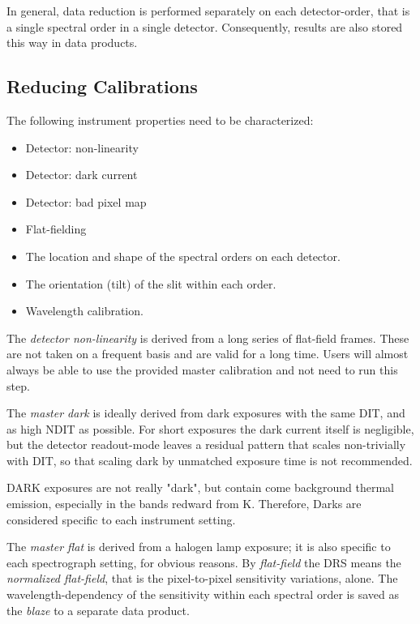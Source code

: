 In general, data reduction is performed separately on each detector-order,
that is a single spectral order in a single detector.
Consequently, results are also stored this way in data products.


\subsection{Reducing Calibrations}
\label{sec:calib:reduc}

The following instrument properties need to be characterized:
\begin{itemize}
    \item Detector: non-linearity
    \item Detector: dark current
    \item Detector: bad pixel map
    \item Flat-fielding
    \item The location and shape of the spectral orders on each detector.
    \item The orientation (tilt) of the slit within each order.
    \item Wavelength calibration.
\end{itemize}

The \emph{detector non-linearity} is derived from a long series of flat-field
frames. These are not taken on a frequent basis and are valid for a long time.
Users will almost always be able to use the provided master calibration and not
need to run this step.

The \emph{master dark} is ideally derived from dark exposures with the
same DIT, and as high NDIT as possible. For short exposures the dark current
itself is negligible, but the detector readout-mode leaves a residual pattern
that scales non-trivially with DIT, so that scaling dark by unmatched exposure
time is not recommended.

DARK exposures are not really "dark", but contain come background thermal
emission, especially in the bands redward from K. Therefore, Darks are
considered specific to each instrument setting.

The \emph{master flat} is derived from a halogen lamp exposure; it is also
specific to each spectrograph setting, for obvious reasons. By \emph{flat-field}
the DRS means the \emph{normalized flat-field}, that is the pixel-to-pixel
sensitivity variations, alone. The wavelength-dependency of the sensitivity
within each spectral order is saved as the \emph{blaze} to a separate data
product.

